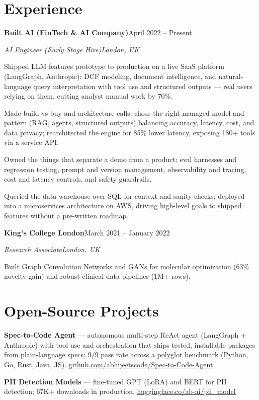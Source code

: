 \documentclass[10pt,a4paper]{article}
\newcommand{\entry}[4]{%
  {\color{company}\bfseries #1}\hfill {\color{muted}#2}\par
  \vspace{1pt}
  {\itshape #3}\hfill {\color{muted}\itshape #4}\par
  \vspace{3pt}%
}
\begin{document}
\section{Experience}
\entry{Built AI (FinTech \& AI Company)}{April 2022 -- Present}{AI Engineer (Early Stage Hire)}{London, UK}
\begin{tight}
  \item Shipped LLM features prototype to production on a live SaaS platform (LangGraph, Anthropic): DCF modeling, document intelligence, and natural-language query interpretation with tool use and structured outputs --- real users relying on them, cutting analyst manual work by 70\%.
  \item Made build-vs-buy and architecture calls: chose the right managed model and pattern (RAG, agents, structured outputs) balancing accuracy, latency, cost, and data privacy; rearchitected the engine for 85\% lower latency, exposing 180+ tools via a service API.
  \item Owned the things that separate a demo from a product: eval harnesses and regression testing, prompt and version management, observability and tracing, cost and latency controls, and safety guardrails.
  \item Queried the data warehouse over SQL for context and sanity-checks; deployed into a microservices architecture on AWS, driving high-level goals to shipped features without a pre-written roadmap.
\end{tight}

\entry{King's College London}{March 2021 -- January 2022}{Research Associate}{London, UK}
\begin{tight}
  \item Built Graph Convolution Networks and GANs for molecular optimization (63\% novelty gain) and robust clinical-data pipelines (1M+ rows).
\end{tight}

\section{Open-Source Projects}
\begin{tight}
  \item \textbf{Spec-to-Code Agent} --- autonomous multi-step ReAct agent (LangGraph + Anthropic) with tool use and orchestration that ships tested, installable packages from plain-language specs; 9/9 pass rate across a polyglot benchmark (Python, Go, Rust, Java, JS). \href{https://github.com/abhijeetscode/Spec-to-Code-Agent}{github.com/abhijeetscode/Spec-to-Code-Agent}
  \item \textbf{PII Detection Models} --- fine-tuned GPT (LoRA) and BERT for PII detection; 67K+ downloads in production. \href{https://huggingface.co/ab-ai/pii_model}{huggingface.co/ab-ai/pii\_model}
\end{tight}
\end{document}
